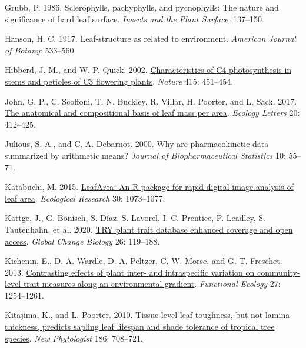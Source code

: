 \documentclass[
  12pt,
  a4paper,
,tablecaptionabove
]{scrartcl}
\newlength{\cslhangindent}
\newenvironment{CSLReferences}[2] %
 {%
  \setlength{\parindent}{0pt}
  \ifodd #1 \everypar{\setlength{\hangindent}{\cslhangindent}}\ignorespaces\fi
  \ifnum #2 > 0
  \setlength{\parskip}{#2\baselineskip}
  \fi
 }%
 {}
\begin{document}
\begin{CSLReferences}{1}{0}
\leavevmode{}%
Grubb, P. 1986. Sclerophylls, pachyphylls, and pycnophylls: {The} nature
and significance of hard leaf surface. \emph{Insects and the Plant
Surface}: 137--150.

\leavevmode{}%
Hanson, H. C. 1917. Leaf-structure as related to environment.
\emph{American Journal of Botany}: 533--560.

\leavevmode{}%
Hibberd, J. M., and W. P. Quick. 2002.
\href{https://doi.org/10.1038/415451a}{Characteristics of {C4}
photosynthesis in stems and petioles of {C3} flowering plants}.
\emph{Nature} 415: 451--454.

\leavevmode{}%
John, G. P., C. Scoffoni, T. N. Buckley, R. Villar, H. Poorter, and L.
Sack. 2017. \href{https://doi.org/10.1111/ele.12739}{The anatomical and
compositional basis of leaf mass per area}. \emph{Ecology Letters} 20:
412--425.

\leavevmode{}%
Julious, S. A., and C. A. Debarnot. 2000. Why are pharmacokinetic data
summarized by arithmetic means? \emph{Journal of Biopharmaceutical
Statistics} 10: 55--71.

\leavevmode{}%
Katabuchi, M. 2015.
\href{https://doi.org/10.1007/s11284-015-1307-x}{{LeafArea}: An {R}
package for rapid digital image analysis of leaf area}. \emph{Ecological
Research} 30: 1073--1077.

\leavevmode{}%
Kattge, J., G. Bönisch, S. Díaz, S. Lavorel, I. C. Prentice, P. Leadley,
S. Tautenhahn, et al. 2020.
\href{https://doi.org/10.1111/gcb.14904}{{TRY} plant trait database
\textendash{} enhanced coverage and open access}. \emph{Global Change
Biology} 26: 119--188.

\leavevmode{}%
Kichenin, E., D. A. Wardle, D. A. Peltzer, C. W. Morse, and G. T.
Freschet. 2013.
\href{https://doi.org/10.1111/1365-2435.12116}{Contrasting effects of
plant inter- and intraspecific variation on community-level trait
measures along an environmental gradient}. \emph{Functional Ecology} 27:
1254--1261.

\leavevmode{}%
Kitajima, K., and L. Poorter. 2010.
\href{https://doi.org/10.1111/j.1469-8137.2010.03212.x}{Tissue-level
leaf toughness, but not lamina thickness, predicts sapling leaf lifespan
and shade tolerance of tropical tree species}. \emph{New Phytologist}
186: 708--721.


\end{CSLReferences}
\end{document}
